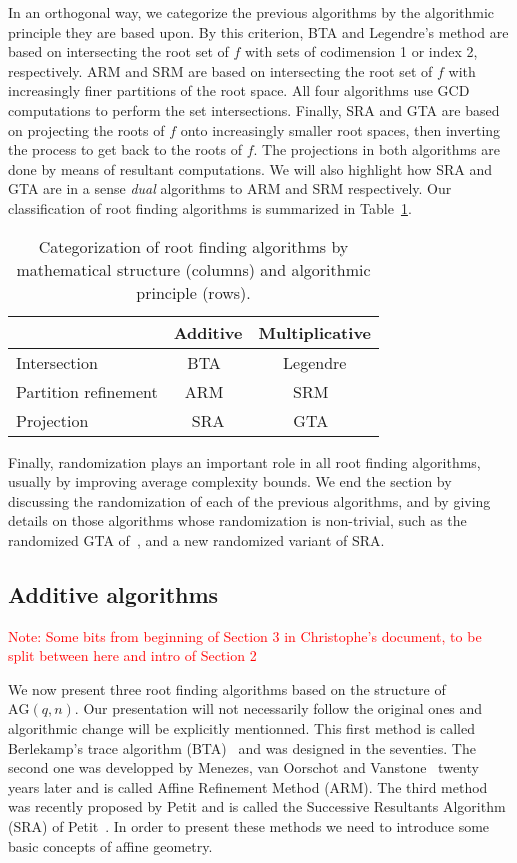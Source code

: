 \documentclass{article}
\newcommand{\qq}{q}
\newcommand{\nn}{n}
\newcommand{\AG}{\mathrm{AG}(\qq,\nn)}
\newcounter{algo}
\newcommand{\Notes}[1]{\textcolor{red}{Note: #1}}
\begin{document}
In an orthogonal way, we categorize the previous algorithms by the
algorithmic principle they are based upon. By this criterion, BTA and
Legendre's method are based on intersecting the root set of $f$ with
sets of codimension 1 or index 2, respectively. ARM and SRM are based
on intersecting the root set of $f$ with increasingly finer partitions
of the root space. All four algorithms use GCD computations to perform
the set intersections. Finally, SRA and GTA are based on projecting
the roots of $f$ onto increasingly smaller root spaces, then inverting
the process to get back to the roots of $f$. The projections in both
algorithms are done by means of resultant computations. We will also
highlight how SRA and GTA are in a sense \emph{dual} algorithms to ARM
and SRM respectively. Our classification of root finding algorithms is
summarized in Table~\ref{tab:algorithms}.

\begin{table}
  \centering
  \begin{tabular}{l | c c}
    & Additive & Multiplicative\\
    \hline
    Intersection & BTA~\cite{berl70} & Legendre\\
    Partition refinement & ARM~\cite{Menvanovans92} & SRM~\cite{Moenck77}\\
    Projection & SRA\cite{cgUCL-P14} & GTA~\cite{grenet2015deterministic}
  \end{tabular}
  \caption{Categorization of root finding algorithms by mathematical structure (columns) and algorithmic principle (rows).}
  \label{tab:algorithms}
\end{table}

Finally, randomization plays an important role in all root finding
algorithms, usually by improving average complexity bounds.  We end
the section by discussing the randomization of each of the previous
algorithms, and by giving details on those algorithms whose
randomization is non-trivial, such as the randomized GTA
of~\cite{grenet-hoeven-lecerf-roots}, and a new randomized variant of
SRA.


\subsection{Additive algorithms}
\label{sec:affine-geom-algor}
\Notes{Some bits from beginning of Section 3 in Christophe's document, to be split between here and  intro of Section 2}

\medskip 

We now present three root finding algorithms based on the structure of $\AG$. Our presentation will not necessarily follow the original ones and algorithmic change will be explicitly mentionned. 
This first method is called Berlekamp's trace algorithm (BTA)~\cite{berl70} and was designed in the seventies. The second one was developped by Menezes, van Oorschot and Vanstone~\cite{Menvanovans92}
 twenty years later and is called Affine Refinement Method (ARM). The third method was recently 
 proposed by Petit and is called the Successive Resultants Algorithm (SRA) of Petit~\cite{cgUCL-P14}. In order to present these methods we need to introduce some basic concepts of affine geometry.
\end{document}
